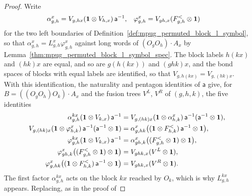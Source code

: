 \begin{proof}\leanok
    Write
    \begin{align}
        \alpha^x_{g,h}  & =V_{g,hx}(\mathbf 1\otimes V_{h,x})\,\mathsf a^{-1}, &
        \varphi^x_{g,h} & =V_{gh,x}(F^<_{g,h}\otimes\mathbf 1)
        \notag
    \end{align}
    for the two left boundaries of Definition~\ref{def:mpug_permuted_block_l_symbol},
    so that $\alpha^x_{g,h}=L^x_{g,h}\varphi^x_{g,h}$ against long words of
    $(O_gO_h)\cdot A_x$ by Lemma~\ref{thm:mpug_permuted_block_l_symbol_spec}.
    The block labels $h(kx)$ and $(hk)x$ are equal, and so are $g(h(kx))$ and
    $(ghk)x$, and the bond spaces of blocks with equal labels are identified,
    so that $V_{g,h(kx)}=V_{g,(hk)x}$. With this identification, the
    naturality and
    pentagon identities of $\mathsf a$ give, for $B=((O_gO_h)O_k)\cdot A_x$
    and the fusion trees $V^L$, $V^R$ of $(g,h,k)$, the five identities
    \begin{align}
        \alpha^{kx}_{g,h}(\mathbf 1\otimes V_{k,x})\,\mathsf a^{-1}
         & =V_{g,(hk)x}(\mathbf 1\otimes\alpha^x_{h,k})\,\mathsf a^{-1}
        (\mathsf a^{-1}\otimes\mathbf 1),
        \label{eq:mpug_permuted_l_compat_first_boundary}                \\
        V_{g,(hk)x}(\mathbf 1\otimes\varphi^x_{h,k})\,\mathsf a^{-1}
        (\mathsf a^{-1}\otimes\mathbf 1)
         & =\alpha^x_{g,hk}
        \bigl((\mathbf 1\otimes F^<_{h,k})\,\mathsf a^{-1}\otimes\mathbf 1\bigr),
        \notag                                                          \\
        \varphi^{kx}_{g,h}(\mathbf 1\otimes V_{k,x})\,\mathsf a^{-1}
         & =\alpha^x_{gh,k}
        \bigl((F^<_{g,h}\otimes\mathbf 1)\otimes\mathbf 1\bigr),
        \notag                                                          \\
        \varphi^x_{gh,k}\bigl((F^<_{g,h}\otimes\mathbf 1)\otimes\mathbf 1\bigr)
         & =V_{ghk,x}(V^L\otimes\mathbf 1),
        \notag                                                          \\
        \varphi^x_{g,hk}
        \bigl((\mathbf 1\otimes F^<_{h,k})\,\mathsf a^{-1}\otimes\mathbf 1\bigr)
         & =V_{ghk,x}(V^R\otimes\mathbf 1).
        \notag
    \end{align}
    The first factor $\alpha^{kx}_{g,h}$ acts on the block $kx$ reached by
    $O_k$, which is why $L^{kx}_{g,h}$ appears. Replacing, as in the proof of

\end{proof}
